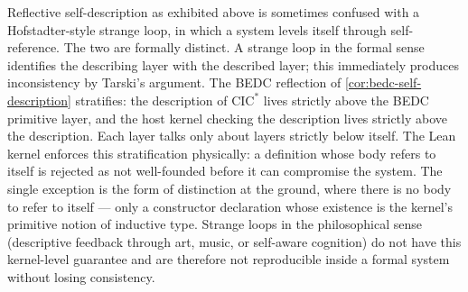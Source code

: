 \begin{remark}
\label{rem:reflection-distinction-from-strange-loop}
Reflective self-description as exhibited above is sometimes confused with a Hofstadter-style strange loop, in which a system levels itself through self-reference. The two are formally distinct. A strange loop in the formal sense identifies the describing layer with the described layer; this immediately produces inconsistency by Tarski's argument. The BEDC reflection of \autoref{cor:bedc-self-description} stratifies: the description of $\mathrm{CIC}^{*}$ lives strictly above the BEDC primitive layer, and the host kernel checking the description lives strictly above the description. Each layer talks only about layers strictly below itself. The Lean kernel enforces this stratification physically: a definition whose body refers to itself is rejected as not well-founded before it can compromise the system. The single exception is the form of distinction at the ground, where there is no body to refer to itself — only a constructor declaration whose existence is the kernel's primitive notion of inductive type. Strange loops in the philosophical sense (descriptive feedback through art, music, or self-aware cognition) do not have this kernel-level guarantee and are therefore not reproducible inside a formal system without losing consistency.
\end{remark}


